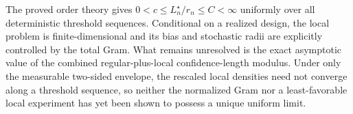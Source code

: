 The proved order theory gives \(0<c\leq L_n^\star/r_n\leq C<\infty\) uniformly over all deterministic threshold sequences.  Conditional on a realized design, the local problem is finite-dimensional and its bias and stochastic radii are explicitly controlled by the total Gram.  What remains unresolved is the exact asymptotic value of the combined regular-plus-local confidence-length modulus.  Under only the measurable two-sided envelope, the rescaled local densities need not converge along a threshold sequence, so neither the normalized Gram nor a least-favorable local experiment has yet been shown to possess a unique uniform limit.